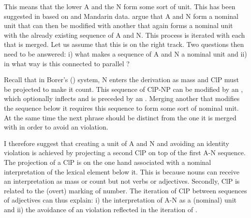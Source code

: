 \documentclass[output=paper,colorlinks,citecolor=brown]{langscibook}
\begin{document}
\z 

This means that the lower A and the N form some sort of unit. This has been suggested in \citet[10--11]{SproatShih1987} based on  and Mandarin data. \citet{SproatShih1987} argue that A and N form a nominal unit that can then be modified with another  that again forms a nominal unit with the already existing sequence of A and N. This process is iterated with each  that is merged. Let us assume that this is on the right track. Two questions then need to be answered: i) what makes a sequence of A and N a nominal unit and ii) in what way is this connected to parallel ?

Recall that in Borer's (\citeyear{borer2005structuring}) system, N enters the derivation as mass and ClP must be projected to make it count. This sequence of ClP-NP can be modified by an , which optionally inflects and is preceded by an . Merging another  that modifies the sequence below it requires this sequence to form some sort of nominal unit. At the same time the next phrase should be distinct from the one it is merged with in order to avoid an  violation. 

\z

I therefore suggest that creating a unit of A and N and avoiding an identity violation is achieved by projecting a second ClP on top of the first A-N sequence. The projection of a ClP is on the one hand associated with a nominal interpretation of the lexical element below it. This is because nouns can receive an interpretation as mass or count but not verbs or adjectives. Secondly, ClP is related to the (overt) marking of number. The iteration of ClP between sequences of  adjectives can thus explain: i) the interpretation of A-N as a (nominal) unit and ii) the avoidance of an  violation reflected in the iteration of .

\ea
\ea[*]{
[AP [AP]]
}
\z 
\z
\end{document}
